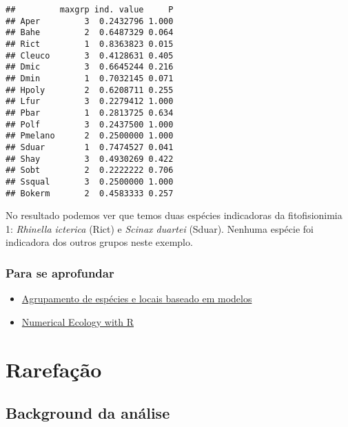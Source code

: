 \documentclass[
]{book}
\providecommand{\tightlist}{%
  \setlength{\itemsep}{0pt}\setlength{\parskip}{0pt}}
\begin{document}
\begin{verbatim}
##         maxgrp ind. value     P
## Aper         3  0.2432796 1.000
## Bahe         2  0.6487329 0.064
## Rict         1  0.8363823 0.015
## Cleuco       3  0.4128631 0.405
## Dmic         3  0.6645244 0.216
## Dmin         1  0.7032145 0.071
## Hpoly        2  0.6208711 0.255
## Lfur         3  0.2279412 1.000
## Pbar         1  0.2813725 0.634
## Polf         3  0.2437500 1.000
## Pmelano      2  0.2500000 1.000
## Sduar        1  0.7474527 0.041
## Shay         3  0.4930269 0.422
## Sobt         2  0.2222222 0.706
## Ssqual       3  0.2500000 1.000
## Bokerm       2  0.4583333 0.257
\end{verbatim}

No resultado podemos ver que temos duas espécies indicadoras da fitofisionimia 1: \emph{Rhinella icterica} (Rict) e \emph{Scinax duartei} (Sduar). Nenhuma espécie foi indicadora dos outros grupos neste exemplo.

\hypertarget{para-se-aprofundar}{%
\subsection{Para se aprofundar}\label{para-se-aprofundar}}

\begin{itemize}
\tightlist
\item
  \href{https://www.sciencedirect.com/science/article/pii/S0304380010006393?casa_token=0YLFbVbGj1IAAAAA:RFcrLHBDdt-NY5gpxCEAqlc8LMG0ayzChpMvaOFQkE10ftg2Us6PafgMQCSmCZZ21eb430e_lWo}{Agrupamento de espécies e locais baseado em modelos}
\item
  \href{http://adn.biol.umontreal.ca/~numericalecology/numecolR/}{Numerical Ecology with R}
\end{itemize}

\hypertarget{rarefauxe7uxe3o}{%
\chapter{Rarefação}\label{rarefauxe7uxe3o}}

\hypertarget{background-da-anuxe1lise}{%
\section{Background da análise}\label{background-da-anuxe1lise}}
\end{document}

